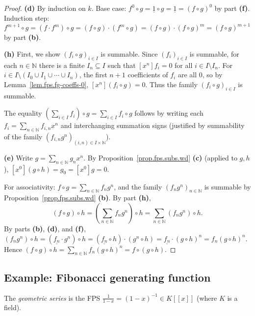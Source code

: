 \begin{proof}
\textbf{(d)} By induction on $k$. Base case: $f^0 \circ g = \underline{1} \circ g
= \underline{1} = (f \circ g)^0$ by part \textbf{(f)}. Induction step:
$f^{m+1} \circ g = (f \cdot f^m) \circ g = (f \circ g) \cdot (f^m \circ g)
= (f \circ g) \cdot (f \circ g)^m = (f \circ g)^{m+1}$ by part \textbf{(b)}.

\textbf{(h)} First, we show $(f_i \circ g)_{i \in I}$ is summable. Since
$(f_i)_{i \in I}$ is summable, for each $n \in \mathbb{N}$ there is a finite
$I_n \subseteq I$ such that $[x^n] f_i = 0$ for all $i \in I \setminus I_n$.
For $i \in I \setminus (I_0 \cup I_1 \cup \cdots \cup I_n)$, the first $n+1$
coefficients of $f_i$ are all $0$, so by Lemma~\ref{lem.fps.fg-coeffs-0},
$[x^n](f_i \circ g) = 0$. Thus the family $(f_i \circ g)_{i \in I}$ is summable.

The equality $(\sum_{i \in I} f_i) \circ g = \sum_{i \in I} f_i \circ g$ follows by
writing each $f_i = \sum_{n \in \mathbb{N}} f_{i,n} x^n$ and interchanging
summation signs (justified by summability of the family
$(f_{i,n} g^n)_{(i,n) \in I \times \mathbb{N}}$).

\textbf{(e)} Write $g = \sum_{n \in \mathbb{N}} g_n x^n$. By
Proposition~\ref{prop.fps.subs.wd} \textbf{(c)} (applied to $g, h$),
$[x^0](g \circ h) = g_0 = [x^0]g = 0$.

For associativity: $f \circ g = \sum_{n \in \mathbb{N}} f_n g^n$, and the
family $(f_n g^n)_{n \in \mathbb{N}}$ is summable by
Proposition~\ref{prop.fps.subs.wd} \textbf{(b)}. By part \textbf{(h)},
\[
(f \circ g) \circ h
= \left(\sum_{n \in \mathbb{N}} f_n g^n\right) \circ h
= \sum_{n \in \mathbb{N}} (f_n g^n) \circ h.
\]
By parts \textbf{(b)}, \textbf{(d)}, and \textbf{(f)},
$(f_n g^n) \circ h = (\underline{f_n} \cdot g^n) \circ h
= (\underline{f_n} \circ h) \cdot (g^n \circ h)
= \underline{f_n} \cdot (g \circ h)^n
= f_n (g \circ h)^n$.
Hence $(f \circ g) \circ h = \sum_{n \in \mathbb{N}} f_n (g \circ h)^n
= f \circ (g \circ h)$.
\end{proof}

\subsection{Example: Fibonacci generating function}

\begin{definition}
\label{def.fps.geometric-series}
\leanhelper
\leanok
The \emph{geometric series} is the FPS $\frac{1}{1-x} = (1-x)^{-1} \in K[[x]]$
(where $K$ is a field).
\end{definition}

